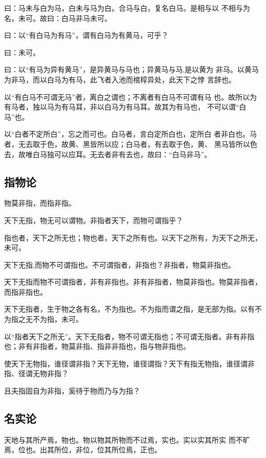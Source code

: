 \documentclass[]{article}
\begin{document}
曰：马未与白为马，白未与马为白。合马与白，复名白马。是相与以
不相与为名，未可。故曰：白马非马未可。

曰：以``有白马为有马''，谓有白马为有黄马，可乎？

曰：未可。

曰：以``有马为异有黄马''，是异黄马与马也；异黄马与马,是以黄为
非马。以黄马为非马，而以白马为有马，此飞者入池而棺椁异处，此天下之悖
言辞也。

以``有白马不可谓无马''者，离白之谓也；不离者有白马不可谓有马
也。故所以为有马者，独以马为有马耳，非以白马为有马耳。故其为有马也，
不可以谓``白马''也。

以``白者不定所白''，忘之而可也。白马者，言白定所白也，定所白
者非白也。马者，无去取于色，故黄、黑皆所以应；白马者，有去取于色，黄、
黑马皆所以色去，故唯白马独可以应耳。无去者非有去也，故曰：``白马非马''。

\hypertarget{header-n14}{%
\subsection{指物论}\label{header-n14}}

物莫非指，而指非指。

天下无指，物无可以谓物。非指者天下，而物可谓指乎？

指也者，天下之所无也；物也者，天下之所有也。以天下之所有，为天下之所无，未可。

天下无指,而物不可谓指也。不可谓指者，非指也？非指者，物莫非指也。

天下无指而物不可谓指者，非有非指也。非有非指者，物莫非指也。物莫非指者，而指非指也。

天下无指者，生于物之各有名，不为指也。不为指而谓之指，是无部为指。以有不为指之无不为指，未可。

以``指者天下之所无''。天下无指者，物不可谓无指也；不可谓无指者。非有非指也；非有非指者，物莫非指、指非非指也，指与物非指也。

使天下无物指，谁径谓非指？天下无物，谁径谓指？天下有指无物指，谁径谓非指、径谓无物非指？

且夫指固自为非指，奚待于物而乃与为指？

\hypertarget{header-n15}{%
\subsection{名实论}\label{header-n15}}

天地与其所产焉，物也。物以物其所物而不过焉，实也。实以实其所实
而不旷焉，位也。出其所位，非位，位其所位焉，正也。
\end{document}
